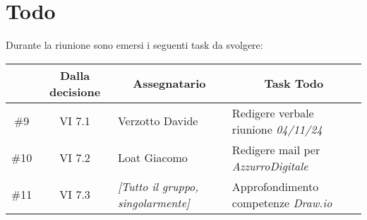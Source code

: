 

\section{Todo}

Durante la riunione sono emersi i seguenti task da svolgere:

\vspace{0.5cm}

\begin{table}[htbp]
\centering
{}
\begin{tabular}{|c|c|p{}|p{}|}
    \hline
    \rowcolor[gray]{0.75}
    \multicolumn{1}{|c|}{\textbf{Codice}} & \multicolumn{1}{|c|}{\textbf{Dalla decisione}} & \multicolumn{1}{|c|}{\textbf{Assegnatario}} & \multicolumn{1}{|c|}{\textbf{Task Todo}} \\
    \hline
    \#9 & VI 7.1 & Verzotto Davide & Redigere verbale riunione \emph{04/11/24} \\
    \hline
    \#10 & VI 7.2 & Loat Giacomo & Redigere mail per \emph{AzzurroDigitale} \\
    \hline
    \#11 & VI 7.3 & \emph{[Tutto il gruppo, singolarmente]} & Approfondimento competenze \emph{Draw.io} \\
    \hline
\end{tabular}
\end{table}
